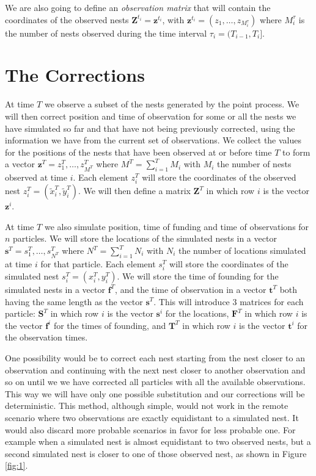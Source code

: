 \documentclass[11pt,a4paper]{article}
\renewcommand{\vec}[1]{\mathbf{#1}}
\begin{document}
{We are also going to define an \textit{observation matrix} that will contain the coordinates of the observed nests $\vec{Z}^{t_i} = \vec{z}^{t_i}$, with $\vec{z}^{t_i} = (z_1, \dots, z_{M^\tau_i})$ where $M^\tau_i$ is the number of nests observed during the time interval $\tau_i = (T_{i-1}, T_i]$.

\section{The Corrections}

At time $T$ we observe a subset of the nests generated by the point process. We will then correct position and time of observation for some or all the nests we have simulated so far and that have not being previously corrected, using the information we have from the current set of observations. We collect the values for the positions of the nests that have been observed at or before time $T$ to form a vector $\vec{z}^T = z^T_1, \dots, z^T_{M^T}$ where $M^T = \sum_{i = 1}^T M_i$ with $M_i$ the number of nests observed at time $i$. Each element $z^T_i$ will store the coordinates of the observed nest $z^T_i = {(\tilde{x}^T_i, \tilde{y}^T_i)}$.  We will then define a matrix $\vec{Z}^T$ in which row $i$ is the vector $\vec{z}^i$.

At time $T$ we also simulate position, time of funding and time of observations for $n$ particles. We will store the locations of the simulated nests in a vector $\vec{s}^T = s^T_1, \dots, s^T_{N^T}$ where $N^T = \sum_{i = 1}^T N_i$ with $N_i$ the number of locations simulated at time $i$ for that particle. Each element $s^T_i$ will store the coordinates of the simulated nest $s^T_i = {(x^T_i, y^T_i)}$. We will store the time of founding for the simulated nests in a vector $\vec{f}^T$, and the time of observation in a vector $\vec{t}^T$ both having the same length as the vector $\vec{s}^T$. This will introduce 3 matrices for each particle: $\vec{S}^T$ in which row $i$ is the vector $\vec{s}^i$ for the locations, $\vec{F}^T$ in which row $i$ is the vector $\vec{f}^i$ for the times of founding, and $\vec{T}^T$ in which row $i$ is the vector $\vec{t}^i$ for the observation times.

One possibility would be to correct each nest starting from the nest closer to an observation and continuing with the next nest closer to another observation and so on until we we have corrected all particles with all the available observations. This way we will have only one possible substitution and our corrections will be deterministic. This method, although simple, would not work in the remote scenario where two observations are exactly equidistant to a simulated nest. It would also discard more probable scenarios in favor for less probable one. For example when a simulated nest is almost equidistant to two observed nests, but a second simulated nest is closer to one of those observed nest, as shown in Figure \ref{fig:1}.


}
\end{document}

